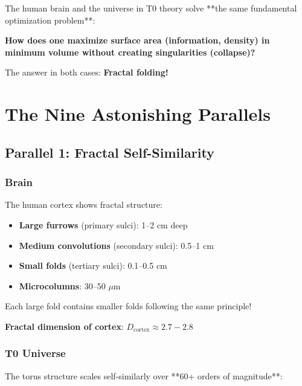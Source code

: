 	\begin{important}
		The human brain and the universe in T0 theory solve **the same fundamental optimization problem**:
		
		\vspace{0.3cm}
		
		\textbf{How does one maximize surface area (information, density) in minimum volume without creating singularities (collapse)?}
		
		\vspace{0.3cm}
		
		The answer in both cases: \textbf{Fractal folding!}
	\end{important}
	
	\section{The Nine Astonishing Parallels}
	
	\subsection{Parallel 1: Fractal Self-Similarity}
	
	\subsubsection{Brain}
	
	The human cortex shows fractal structure:
	\begin{itemize}
		\item \textbf{Large furrows} (primary sulci): 1--2 cm deep
		\item \textbf{Medium convolutions} (secondary sulci): 0.5--1 cm
		\item \textbf{Small folds} (tertiary sulci): 0.1--0.5 cm
		\item \textbf{Microcolumns}: 30--50 $\mu$m
	\end{itemize}
	
	Each large fold contains smaller folds following the same principle!
	
	\textbf{Fractal dimension of cortex}: $D_{\text{cortex}} \approx 2.7 - 2.8$
	
	\subsubsection{T0 Universe}
	
	The torus structure scales self-similarly over **60+ orders of magnitude**:
	
